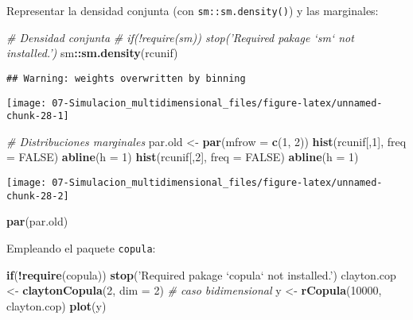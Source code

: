 \documentclass[
]{book}
\newenvironment{Shaded}{\begin{snugshade}}{\end{snugshade}}
\newcommand{\CommentTok}[1]{\textcolor[rgb]{0.56,0.35,0.01}{\textit{#1}}}
\newcommand{\ControlFlowTok}[1]{\textcolor[rgb]{0.13,0.29,0.53}{\textbf{#1}}}
\newcommand{\DataTypeTok}[1]{\textcolor[rgb]{0.13,0.29,0.53}{#1}}
\newcommand{\DecValTok}[1]{\textcolor[rgb]{0.00,0.00,0.81}{#1}}
\newcommand{\KeywordTok}[1]{\textcolor[rgb]{0.13,0.29,0.53}{\textbf{#1}}}
\newcommand{\NormalTok}[1]{#1}
\newcommand{\OperatorTok}[1]{\textcolor[rgb]{0.81,0.36,0.00}{\textbf{#1}}}
\newcommand{\OtherTok}[1]{\textcolor[rgb]{0.56,0.35,0.01}{#1}}
\newcommand{\StringTok}[1]{\textcolor[rgb]{0.31,0.60,0.02}{#1}}
\theoremstyle{break}
\theoremstyle{definition}
\theoremstyle{definition}
\theoremstyle{definition}
\theoremstyle{remark}
\begin{document}
\begin{enumerate}
  Representar la densidad conjunta (con \texttt{sm::sm.density()}) y las marginales:

\begin{Shaded}
\begin{Highlighting}[]
\CommentTok{# Densidad conjunta}
\CommentTok{# if(!require(sm)) stop('Required pakage `sm` not installed.')}
\NormalTok{sm}\OperatorTok{::}\KeywordTok{sm.density}\NormalTok{(rcunif)}
\end{Highlighting}
\end{Shaded}

\begin{verbatim}
## Warning: weights overwritten by binning
\end{verbatim}

  \begin{center}\texttt{[image: 07-Simulacion\_multidimensional\_files/figure-latex/unnamed-chunk-28-1]} \end{center}

\begin{Shaded}
\begin{Highlighting}[]
\CommentTok{# Distribuciones marginales}
\NormalTok{par.old <-}\StringTok{ }\KeywordTok{par}\NormalTok{(}\DataTypeTok{mfrow =} \KeywordTok{c}\NormalTok{(}\DecValTok{1}\NormalTok{, }\DecValTok{2}\NormalTok{))}
\KeywordTok{hist}\NormalTok{(rcunif[,}\DecValTok{1}\NormalTok{], }\DataTypeTok{freq =} \OtherTok{FALSE}\NormalTok{)}
\KeywordTok{abline}\NormalTok{(}\DataTypeTok{h =} \DecValTok{1}\NormalTok{)}
\KeywordTok{hist}\NormalTok{(rcunif[,}\DecValTok{2}\NormalTok{], }\DataTypeTok{freq =} \OtherTok{FALSE}\NormalTok{)}
\KeywordTok{abline}\NormalTok{(}\DataTypeTok{h =} \DecValTok{1}\NormalTok{)}
\end{Highlighting}
\end{Shaded}

  \begin{center}\texttt{[image: 07-Simulacion\_multidimensional\_files/figure-latex/unnamed-chunk-28-2]} \end{center}

\begin{Shaded}
\begin{Highlighting}[]
\KeywordTok{par}\NormalTok{(par.old)}
\end{Highlighting}
\end{Shaded}

  Empleando el paquete \texttt{copula}:

\begin{Shaded}
\begin{Highlighting}[]
\ControlFlowTok{if}\NormalTok{(}\OperatorTok{!}\KeywordTok{require}\NormalTok{(copula)) }\KeywordTok{stop}\NormalTok{(}\StringTok{'Required pakage `copula` not installed.'}\NormalTok{)}
\NormalTok{clayton.cop <-}\StringTok{ }\KeywordTok{claytonCopula}\NormalTok{(}\DecValTok{2}\NormalTok{, }\DataTypeTok{dim =} \DecValTok{2}\NormalTok{) }\CommentTok{# caso bidimensional}
\NormalTok{y <-}\StringTok{ }\KeywordTok{rCopula}\NormalTok{(}\DecValTok{10000}\NormalTok{, clayton.cop)}
\KeywordTok{plot}\NormalTok{(y)}
\end{Highlighting}
\end{Shaded}


\end{enumerate}
\end{document}
